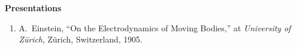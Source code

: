 \clearpage
\begin{center}
\vspace*{0.5cm}
{\Large \bf  Presentations}
\end{center}
\vspace*{0.5cm}
{\small
\begin{enumerate}


\item A.~Einstein, ``On the Electrodynamics of Moving Bodies,'' at \emph{University of Z\"urich}, Z\"urich, Switzerland, 1905.

\end{enumerate}
}